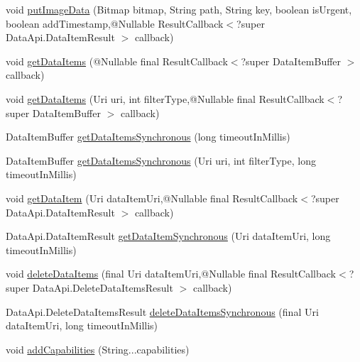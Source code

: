 \begin{DoxyCompactItemize}
\item 
void \hyperlink{classcom_1_1google_1_1devrel_1_1wcl_1_1WearManager_afe32818d5441719bd637aa569192990c}{put\+Image\+Data} (Bitmap bitmap, String path, String key, boolean is\+Urgent, boolean add\+Timestamp,@Nullable Result\+Callback$<$?super Data\+Api.\+Data\+Item\+Result $>$ callback)
\item 
void \hyperlink{classcom_1_1google_1_1devrel_1_1wcl_1_1WearManager_ac248440b3e3b20ea0566b1a7aa4100af}{get\+Data\+Items} (@Nullable final Result\+Callback$<$?super Data\+Item\+Buffer $>$ callback)
\item 
void \hyperlink{classcom_1_1google_1_1devrel_1_1wcl_1_1WearManager_a757b3a252a37b4149c64fa2393291fe0}{get\+Data\+Items} (Uri uri, int filter\+Type,@Nullable final Result\+Callback$<$?super Data\+Item\+Buffer $>$ callback)
\item 
Data\+Item\+Buffer \hyperlink{classcom_1_1google_1_1devrel_1_1wcl_1_1WearManager_a58de012135e7a6fb834de542d5a23da5}{get\+Data\+Items\+Synchronous} (long timeout\+In\+Millis)
\item 
Data\+Item\+Buffer \hyperlink{classcom_1_1google_1_1devrel_1_1wcl_1_1WearManager_aa5b2cdca8ae67601cf9c6e802ee3c48e}{get\+Data\+Items\+Synchronous} (Uri uri, int filter\+Type, long timeout\+In\+Millis)
\item 
void \hyperlink{classcom_1_1google_1_1devrel_1_1wcl_1_1WearManager_a09228240a5a112a6b6933186a0d783c2}{get\+Data\+Item} (Uri data\+Item\+Uri,@Nullable final Result\+Callback$<$?super Data\+Api.\+Data\+Item\+Result $>$ callback)
\item 
Data\+Api.\+Data\+Item\+Result \hyperlink{classcom_1_1google_1_1devrel_1_1wcl_1_1WearManager_ae3e36b6ba6366a30a7194524d3975902}{get\+Data\+Item\+Synchronous} (Uri data\+Item\+Uri, long timeout\+In\+Millis)
\item 
void \hyperlink{classcom_1_1google_1_1devrel_1_1wcl_1_1WearManager_a571cf7c7e9c2ed0e759588f53e6ca4f0}{delete\+Data\+Items} (final Uri data\+Item\+Uri,@Nullable final Result\+Callback$<$?super Data\+Api.\+Delete\+Data\+Items\+Result $>$ callback)
\item 
Data\+Api.\+Delete\+Data\+Items\+Result \hyperlink{classcom_1_1google_1_1devrel_1_1wcl_1_1WearManager_a34d68a1630f16f04133026619c8fb1c2}{delete\+Data\+Items\+Synchronous} (final Uri data\+Item\+Uri, long timeout\+In\+Millis)
\item 
void \hyperlink{classcom_1_1google_1_1devrel_1_1wcl_1_1WearManager_af4d5cdb42452cbedf04e9983ee97e204}{add\+Capabilities} (String...\+capabilities)
\item 

\end{DoxyCompactItemize}
